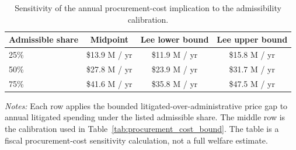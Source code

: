 \begin{table}[ht]
\centering
\caption{Sensitivity of the annual procurement-cost implication to the admissibility calibration.}
\label{tab:procurement_cost_sensitivity}
\begin{threeparttable}
\small
\begin{tabular}{lccc}
\toprule
Admissible share & Midpoint & Lee lower bound & Lee upper bound \\
\midrule
25\% & \$13.9 M / yr & \$11.9 M / yr & \$15.8 M / yr \\
50\% & \$27.8 M / yr & \$23.9 M / yr & \$31.7 M / yr \\
75\% & \$41.6 M / yr & \$35.8 M / yr & \$47.5 M / yr \\
\bottomrule
\end{tabular}
\begin{tablenotes}[flushleft]\footnotesize
\item \textit{Notes:} Each row applies the bounded litigated-over-administrative price gap to annual litigated spending under the listed admissible share. The middle row is the calibration used in Table~\ref{tab:procurement_cost_bound}. The table is a fiscal procurement-cost sensitivity calculation, not a full welfare estimate.
\end{tablenotes}
\end{threeparttable}
\end{table}
